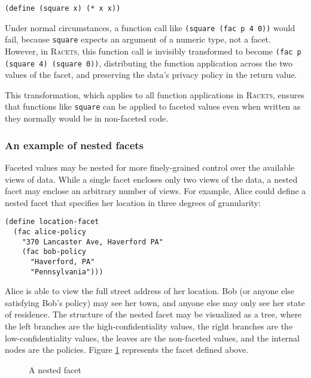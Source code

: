\documentclass{article}
\begin{document}
\begin{lstlisting}
(define (square x) (* x x))
\end{lstlisting}

Under normal circumstances, a function call like \texttt{(square (fac p 4 0))} would fail, because \texttt{square} expects an argument of a numeric type, not a facet. However, in \textsc{Racets}, this function call is invisibly transformed to become \texttt{(fac p (square 4) (square 0))}, distributing the function application across the two values of the facet, and preserving the data's privacy policy in the return value.

This transformation, which applies to all function applications in \textsc{Racets}, ensures that functions like \texttt{square} can be applied to faceted values even when written as they normally would be in non-faceted code.


\subsubsection{An example of nested facets}
Faceted values may be nested for more finely-grained control over the available views of data. While a single facet encloses only two views of the data, a nested facet may enclose an arbitrary number of views. For example, Alice could define a nested facet that specifies her location in three degrees of granularity:

\begin{lstlisting}
(define location-facet
  (fac alice-policy
    "370 Lancaster Ave, Haverford PA"
    (fac bob-policy
      "Haverford, PA"
      "Pennsylvania")))
\end{lstlisting}

Alice is able to view the full street address of her location. Bob (or anyone else satisfying Bob's policy) may see her town, and anyone else may only see her state of residence. The structure of the nested facet may be visualized as a tree, where the left branches are the high-confidentiality values, the right branches are the low-confidentiality values, the leaves are the non-faceted values, and the internal nodes are the policies. Figure \ref{figure:nested} represents the facet defined above.

\begin{figure}[h]
\begin{center}
	\caption{A nested facet}
	\label{figure:nested}
\end{center}
\end{figure}
\end{document}
